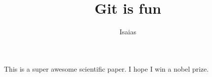 \documentclass[10pt]{article}
\author{Isaias}
\title{Git is fun}
\begin{document}
	\maketitle

	This is a super awesome scientific paper.
	I hope I win a nobel prize.
\end{document}
